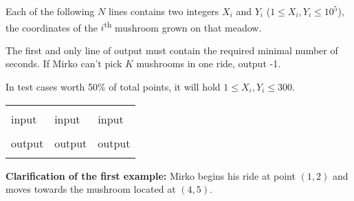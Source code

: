Each of the following $N$ lines contains two integers $X_i$ and $Y_i$ ($1 \leqslant X_i, Y_i \leqslant 10^5$), the coordinates of the $i$\textsuperscript{th} mushroom grown on that meadow.


The first and only line of output must contain the required minimal number of seconds.
If Mirko can't pick $K$ mushrooms in one ride, output -1.


In test cases worth 50\% of total points, it will hold $1 \leqslant X_i, Y_i \leqslant 300$.

\strut


\begin{center}
\fontfamily{\ttdefault}
\fontsize{10pt}{1em}
\selectfont
\begin{tabu}to 0.99\textwidth{|X[1]|X[1]|X[1]|}
\hline
& & \\ 
\rowfont{\fontsize{10pt}{1em}\bfseries}
input & input & input\\
 &
 & 
 \\
\rowfont{\fontsize{10pt}{1em}\bfseries}
output & output & output\\
 &
 & 
 \\
\hline
\end{tabu}
\end{center}

{
\fontsize{10pt}{1em}
\selectfont
\textbf{Clarification of the first example:} Mirko begins his ride at point $(1, 2)$ and moves towards the mushroom located at $(4, 5)$. \\
}